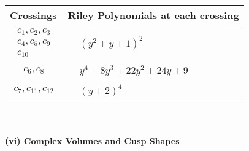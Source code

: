 \documentclass[1p]{elsarticle_modified}
\theoremstyle{definition}
\begin{document}
\begin{tabular}{m{50pt}|m{274pt}}
Crossings & \hspace{64pt}Riley Polynomials at each crossing \\
\hline $$\begin{aligned}c_{1},c_{2},c_{3}\\c_{4},c_{5},c_{9}\\c_{10}\end{aligned}$$&$\begin{aligned}
&(y^2+y+1)^2
\end{aligned}$\\
\hline $$\begin{aligned}c_{6},c_{8}\end{aligned}$$&$\begin{aligned}
&y^4-8 y^3+22 y^2+24 y+9
\end{aligned}$\\
\hline $$\begin{aligned}c_{7},c_{11},c_{12}\end{aligned}$$&$\begin{aligned}
&(y+2)^4
\end{aligned}$\\
\hline
\end{tabular}\\~\\
\newpage\flushleft \textbf{(vi) Complex Volumes and Cusp Shapes}
\end{document}
